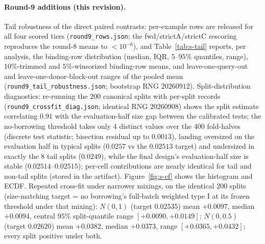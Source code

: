 \documentclass[11pt]{article}
\begin{document}
\paragraph{Round-9 additions (this revision).} Tail robustness of the
direct paired contrasts: per-example rows are released for all four
scored tiers (\texttt{round9\_rows.json}; the fwd/strictA/strictC
rescoring reproduces the round-8 means to $<10^{-6}$), and
Table~\ref{tab:s-tail} reports, per analysis, the binding-row
distribution (median, IQR, $5$--$95\%$ quantiles, range), $10\%$-trimmed
and $5\%$-winsorized binding-row means, and leave-one-query-out and
leave-one-donor-block-out ranges of the pooled mean
(\texttt{round9\_tail\_robustness.json}; bootstrap RNG $20260912$).
Split-distribution diagnostics: re-running the $200$ canonical splits
with per-split records (\texttt{round9\_crossfit\_diag.json}; identical
RNG $20260908$) shows the split estimate correlating $0.91$ with the
evaluation-half size gap between the calibrated tests; the no-borrowing
threshold takes only $4$ distinct values over the $400$ fold-halves
(discrete test statistic; bisection residual up to $0.0013$), landing
oversized on the evaluation half in typical splits ($0.0257$ vs the
$0.02513$ target) and undersized in exactly the $8$ tail splits
($0.0249$), while the final design's evaluation-half size is stable
($0.02514$--$0.02515$); per-cell contributions are nearly identical for
tail and non-tail splits (stored in the artifact). Figure~\ref{fig:s-cf}
shows the histogram and ECDF. Repeated cross-fit under narrower
mixings, on the identical $200$ splits (size-matching target = no
borrowing's full-batch weighted type I at its frozen threshold under
that mixing): $N(0,1)$ (target $0.02535$) mean $+0.0097$, median
$+0.0094$, central $95\%$ split-quantile range $[+0.0090,+0.0149]$;
$N(0,0.5)$ (target $0.02620$) mean $+0.0382$, median $+0.0373$, range
$[+0.0365,+0.0432]$; every split positive under both.
\end{document}
